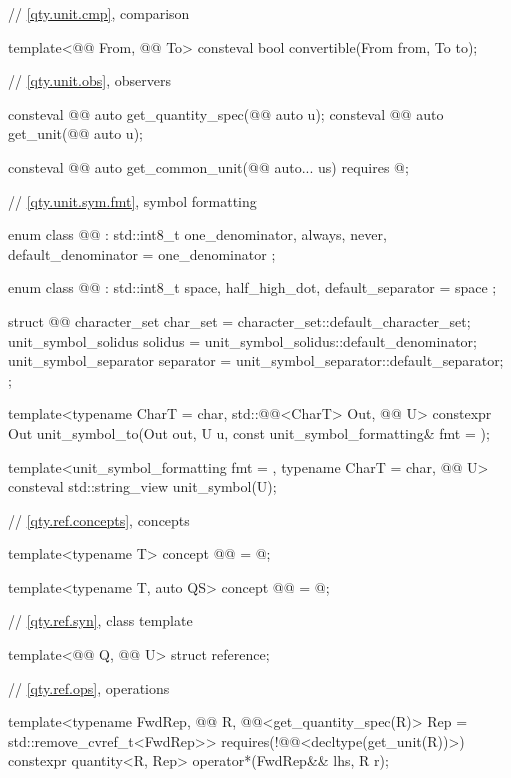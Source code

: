 \begin{codeblock}
{// \ref{qty.unit.cmp}, comparison

template<@@ From, @@ To>
consteval bool convertible(From from, To to);

// \ref{qty.unit.obs}, observers

consteval @@ auto get_quantity_spec(@@ auto u);
consteval @@ auto get_unit(@@ auto u);

consteval @@ auto get_common_unit(@@ auto... us)
  requires @\seebelownc@;

// \ref{qty.unit.sym.fmt}, symbol formatting

enum class @@ : std::int8_t {
  one_denominator,
  always,
  never,
  default_denominator = one_denominator
};

enum class @@ : std::int8_t {
  space,
  half_high_dot,
  default_separator = space
};

struct @@ {
  character_set char_set = character_set::default_character_set;
  unit_symbol_solidus solidus = unit_symbol_solidus::default_denominator;
  unit_symbol_separator separator = unit_symbol_separator::default_separator;
};

template<typename CharT = char, std::@@<CharT> Out, @@ U>
constexpr Out unit_symbol_to(Out out, U u, const unit_symbol_formatting& fmt = {});

template<unit_symbol_formatting fmt = {}, typename CharT = char, @@ U>
consteval std::string_view unit_symbol(U);

// \ref{qty.ref.concepts}, concepts

template<typename T>
concept @@ = @\seebelownc@;

template<typename T, auto QS>
concept @@ = @\seebelownc@;

// \ref{qty.ref.syn}, class template 

template<@@ Q, @@ U>
struct reference;

// \ref{qty.ref.ops}, operations

template<typename FwdRep, @@ R,
         @@<get_quantity_spec(R{})> Rep = std::remove_cvref_t<FwdRep>>
  requires(!@@<decltype(get_unit(R{}))>)
constexpr quantity<R{}, Rep> operator*(FwdRep&& lhs, R r);

}
\end{codeblock}
